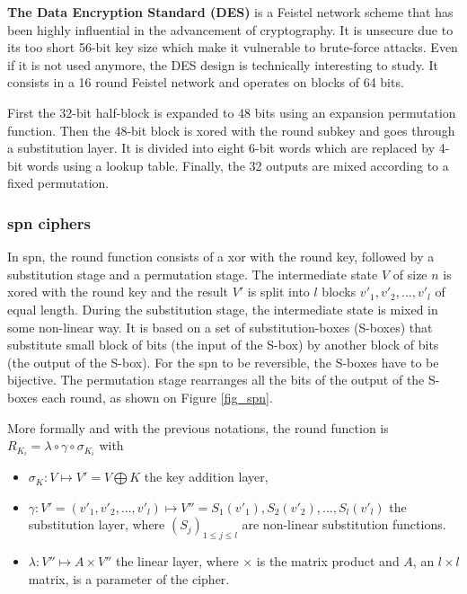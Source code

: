 \documentclass[11pt]{sdm}
\begin{document}
\textbf{The Data Encryption Standard (DES)} is a Feistel network scheme that has been highly influential in the advancement of cryptography.
It is unsecure due to its too short 56-bit key size which make it vulnerable to brute-force attacks.
Even if it is not used anymore, the DES design is technically interesting to study.
It consists in a 16 round Feistel network and operates on blocks of 64 bits.

First the 32-bit half-block is expanded to 48 bits using an expansion permutation function.
Then the 48-bit block is xored with the round subkey and goes through a substitution layer.
It is divided into eight 6-bit words which are replaced by 4-bit words using a lookup table.
Finally, the 32 outputs are mixed according to a fixed permutation.


\subsubsection{\gls{spn} ciphers}

In \acrfull{spn}, the round function consists of a xor with the round key, followed by a substitution stage and a permutation stage.
The intermediate state $V$ of size $n$ is xored with the round key and the result $V'$ is split into $l$ blocks $v'_1,v'_2,...,v'_l$ of equal length.
During the substitution stage, the intermediate state is mixed in some non-linear way.
It is based on a set of substitution-boxes (S-boxes) that substitute small block of bits (the input of the S-box) by another block of bits (the output of the S-box).
For the \gls{spn} to be reversible, the S-boxes have to be bijective.
The permutation stage rearranges all the bits of the output of the S-boxes each round, as shown on Figure \ref{fig_spn}.

More formally and with the previous notations, the round function is $R_{K_i} = \lambda \circ \gamma \circ \sigma_{K_i}$ with
\begin{itemize}
    \item $\sigma_{K}:V \mapsto V' = V \bigoplus K$ the key addition layer,
    \item $\gamma : V'=(v'_1,v'_2,...,v'_l) \mapsto V'' = S_1(v'_1),S_2(v'_2),...,S_l(v'_l)$ the substitution layer, where $(S_j)_{1\leq j \leq l}$ are non-linear substitution functions.
    \item $\lambda : V'' \mapsto A \times V''$ the linear layer, where $\times$ is the matrix product and $A$, an $l\times l$ matrix, is a parameter of the cipher.
\end{itemize}
\end{document}
